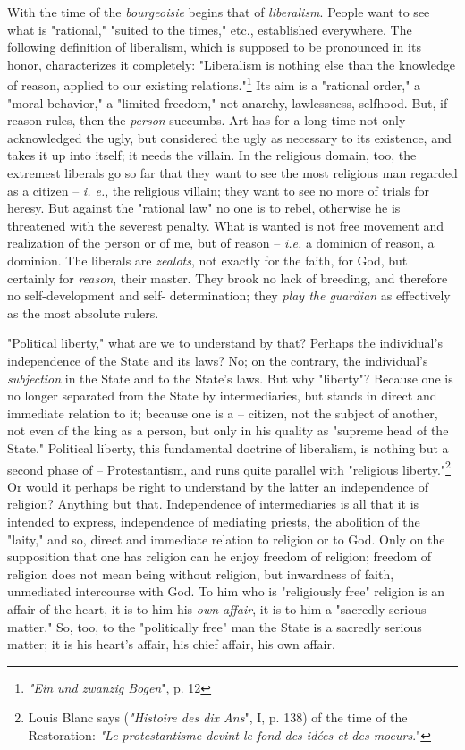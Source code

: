 With the time of the \textit{bourgeoisie} begins that of \textit{liberalism}. 
People want to see what is "{}rational,"{} "{}suited to the times,"{} etc., 
established everywhere. The following definition of liberalism, which is 
supposed to be pronounced in its honor, characterizes it completely: 
"{}Liberalism is nothing else than the knowledge of reason, applied to our 
existing relations."{}\footnote{\textit{"{}Ein und zwanzig Bogen}"{}, p. 12} 
Its aim is a "{}rational order,"{} a "{}moral behavior,"{} a "{}limited 
freedom,"{} not anarchy, lawlessness, selfhood. But, if reason rules, then the 
\textit{person} succumbs. Art has for a long time not only acknowledged the 
ugly, but considered the ugly as necessary to its existence, and takes it up 
into itself; it needs the villain. In the religious domain, too, the extremest 
liberals go so far that they want to see the most religious man regarded as a 
citizen -- \textit{i. e.}, the religious villain; they want to see no more of 
trials for heresy. But against the "{}rational law"{} no one is to rebel, 
otherwise he is threatened with the severest penalty. What is wanted is not 
free movement and realization of the person or of me, but of reason -- 
\textit{i.e.} a dominion of reason, a dominion. The liberals are 
\textit{zealots}, not exactly for the faith, for God, but certainly for 
\textit{reason}, their master. They brook no lack of breeding, and therefore 
no self-development and self- determination; they \textit{play the guardian} 
as effectively as the most absolute rulers.

"{}Political liberty,"{} what are we to understand by that? Perhaps the 
individual's independence of the State and its laws? No; on the contrary, the 
individual's \textit{subjection} in the State and to the State's laws. But why 
"{}liberty"{}? Because one is no longer separated from the State by 
intermediaries, but stands in direct and immediate relation to it; because one 
is a -- citizen, not the subject of another, not even of the king as a person, 
but only in his quality as "{}supreme head of the State."{} Political liberty, 
this fundamental doctrine of liberalism, is nothing but a second phase of -- 
Protestantism, and runs quite parallel with "{}religious 
liberty."{}\footnote{Louis Blanc says (\textit{"{}Histoire des dix Ans}"{}, I, 
p. 138) of the time of the Restoration: \textit{"{}Le protestantisme devint le 
fond des id\'ees et des moeurs}."{}} Or would it perhaps be right to 
understand by the latter an independence of religion? Anything but that. 
Independence of intermediaries is all that it is intended to express, 
independence of mediating priests, the abolition of the "{}laity,"{} and so, 
direct and immediate relation to religion or to God. Only on the supposition 
that one has religion can he enjoy freedom of religion; freedom of religion 
does not mean being without religion, but inwardness of faith, unmediated 
intercourse with God. To him who is "{}religiously free"{} religion is an 
affair of the heart, it is to him his \textit{own affair}, it is to him a 
"{}sacredly serious matter."{} So, too, to the "{}politically free"{} man the 
State is a sacredly serious matter; it is his heart's affair, his chief 
affair, his own affair.

